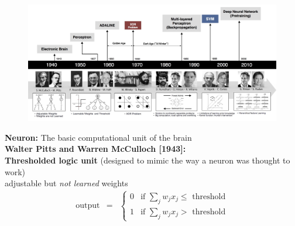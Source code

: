 \documentclass[10pt, compress]{beamer}
\begin{document}
\begin{frame}
\begin{figure}
  \includegraphics[width=1\linewidth]{imgs/nn_timeline}
\end{figure}
\end{frame}

\begin{frame}
  \vspace*{1cm}
  \textbf{Neuron:} The basic computational unit of the brain  \\
  \textbf{Walter Pitts and Warren McCulloch [1943]:}\\
  \textbf{Thresholded logic unit} (designed to mimic the way a neuron was thought to work) \\
  adjustable but \textit{not learned} weights \\
  \vspace*{-.5cm}
  \begin{eqnarray}
  \mbox{output} & = & \left\{ \begin{array}{ll}
  0 & \mbox{if } \sum_j w_j x_j \leq \mbox{ threshold} \\
  1 & \mbox{if } \sum_j w_j x_j > \mbox{ threshold}
  \end{array} \right.
  \nonumber
  \end{eqnarray}
  \hrulefill \\
  \begin{figure}[ht]
  	\centering
  	\qquad
  \end{figure}
\end{frame}
\end{document}
